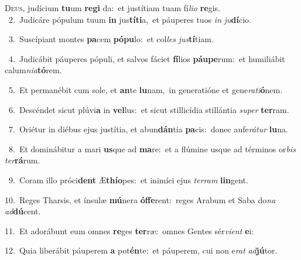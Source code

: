 \lettrine{\initial\textcolor{\initialcolor}{D}}{eus,} judícium \textbf{tu}\-um \textbf{re}\-\textbf{gi} da:~\star et justítiam tuam fí\-\textit{li}\-\textit{o} \textbf{re}\-gis.\\
{\numbfont\textcolor{\numbcolor}{~2.}}~Judicáre pópulum tuum \textbf{in} jus\-\textbf{tí}\-\textbf{ti}a,~\star et páuperes tuos \textit{in} \textit{ju}\-\textbf{dí}cio.\par
{\numbfont\textcolor{\numbcolor}{~3.}}~Suscípiant montes \textbf{pa}\-cem \textbf{pó}\-\textbf{pu}lo:~\star et col\textit{les} \textit{jus}\-\textbf{tí}tiam.\par
{\numbfont\textcolor{\numbcolor}{~4.}}~Judicábit páuperes pópuli, et salvos fáciet \textbf{fí}\-lios \textbf{páu}\-\textbf{pe}rum:~\star et humiliábit calum\-\textit{ni}\-\textit{a}\textbf{tó}rem.\par
{\numbfont\textcolor{\numbcolor}{~5.}}~Et permanébit cum sole, et \textbf{an}\-te \textbf{lu}\-nam,~\star in generatióne et gene\-\textit{ra}\-\textit{ti}\textbf{ó}nem.\par
{\numbfont\textcolor{\numbcolor}{~6.}}~Descéndet sicut plúvi\textbf{a} in \textbf{vel}\-lus:~\star et sicut stillicídia stillántia \textit{su}\-\textit{per} \textbf{ter}\-ram.\par
{\numbfont\textcolor{\numbcolor}{~7.}}~Oriétur in diébus ejus justítia, et abun\-\textbf{dán}\-tia \textbf{pa}\-cis:~\star donec aufe\-\textit{rá}\-\textit{tur} \textbf{lu}\-na.\par
{\numbfont\textcolor{\numbcolor}{~8.}}~Et dominábitur a mari \textbf{us}\-que ad \textbf{ma}\-re:~\star et a flúmine usque ad términos or\textit{bis} \textit{ter}\-\textbf{rá}rum.\par
{\numbfont\textcolor{\numbcolor}{~9.}}~Coram illo próci\textbf{dent} Æ\-\textbf{thí}\-\textbf{o}pes:~\star et inimíci ejus \textit{ter}\-\textit{ram} \textbf{lin}\-gent.\par
{\numbfont\textcolor{\numbcolor}{10.}}~Reges Tharsis, et ínsulæ \textbf{mú}\-nera \textbf{óf}\-\textbf{fe}rent:~\star reges Arabum et Saba do\textit{na} \textit{ad}\-\textbf{dú}cent.\par
{\numbfont\textcolor{\numbcolor}{11.}}~Et adorábunt eum omnes \textbf{re}\-ges \textbf{ter}\-ræ:~\star omnes Gentes sér\-\textit{vi}\-\textit{ent} \textbf{e}\-i:\par
{\numbfont\textcolor{\numbcolor}{12.}}~Quia liberábit páuperem \textbf{a} pot\-\textbf{én}\-te:~\star et páuperem, cui non e\textit{rat} \textit{ad}\-\textbf{jú}tor.\par
